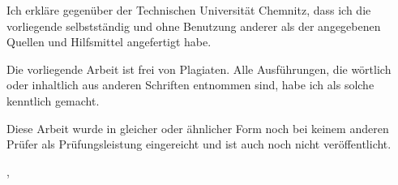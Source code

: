 \begin{tucerklaerung}
  \vspace{1em}\noindent
  Ich erkläre gegenüber der Technischen Universität Chemnitz, dass ich die vorliegende \thesistype{} selbstständig und ohne Benutzung anderer als der angegebenen Quellen und Hilfsmittel angefertigt habe.

  \vspace{1em}\noindent
  Die vorliegende Arbeit ist frei von Plagiaten. Alle Ausführungen, die wörtlich oder inhaltlich aus anderen Schriften entnommen sind, habe ich als solche kenntlich gemacht.

  \vspace{1em}\noindent
  Diese Arbeit wurde in gleicher oder ähnlicher Form noch bei keinem anderen Prüfer als Prüfungsleistung eingereicht und ist auch noch nicht veröffentlicht.


  \begin{flushright}
    \place, \makeatletter\@date\makeatother
  \end{flushright}

\end{tucerklaerung}
